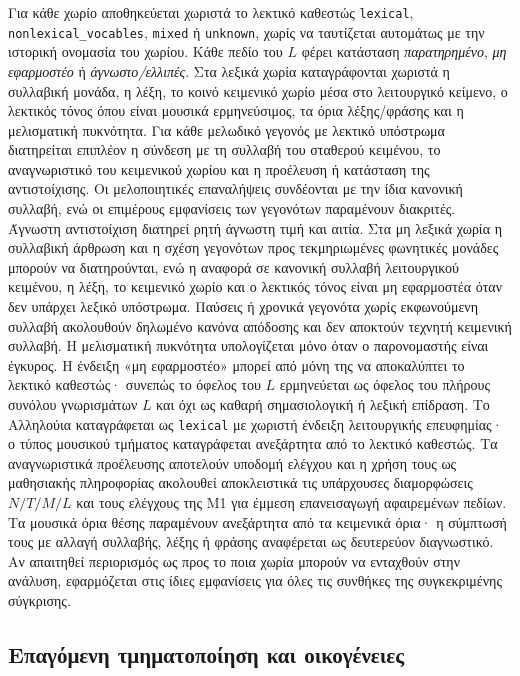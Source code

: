 \documentclass[11pt,a4paper]{article}
\begin{document}
Για κάθε χωρίο αποθηκεύεται χωριστά το λεκτικό καθεστώς \texttt{lexical}, \texttt{nonlexical\_vocables}, \texttt{mixed} ή \texttt{unknown}, χωρίς να ταυτίζεται αυτομάτως με την ιστορική ονομασία του χωρίου. Κάθε πεδίο του $L$ φέρει κατάσταση \emph{παρατηρημένο}, \emph{μη εφαρμοστέο} ή \emph{άγνωστο/ελλιπές}. Στα λεξικά χωρία καταγράφονται χωριστά η συλλαβική μονάδα, η λέξη, το κοινό κειμενικό χωρίο μέσα στο λειτουργικό κείμενο, ο λεκτικός τόνος όπου είναι μουσικά ερμηνεύσιμος, τα όρια λέξης/φράσης και η μελισματική πυκνότητα. Για κάθε μελωδικό γεγονός με λεκτικό υπόστρωμα διατηρείται επιπλέον η σύνδεση με τη συλλαβή του σταθερού κειμένου, το αναγνωριστικό του κειμενικού χωρίου και η προέλευση ή κατάσταση της αντιστοίχισης. Οι μελοποιητικές επαναλήψεις συνδέονται με την ίδια κανονική συλλαβή, ενώ οι επιμέρους εμφανίσεις των γεγονότων παραμένουν διακριτές. Άγνωστη αντιστοίχιση διατηρεί ρητή άγνωστη τιμή και αιτία. Στα μη λεξικά χωρία η συλλαβική άρθρωση και η σχέση γεγονότων προς τεκμηριωμένες φωνητικές μονάδες μπορούν να διατηρούνται, ενώ η αναφορά σε κανονική συλλαβή λειτουργικού κειμένου, η λέξη, το κειμενικό χωρίο και ο λεκτικός τόνος είναι μη εφαρμοστέα όταν δεν υπάρχει λεξικό υπόστρωμα. Παύσεις ή χρονικά γεγονότα χωρίς εκφωνούμενη συλλαβή ακολουθούν δηλωμένο κανόνα απόδοσης και δεν αποκτούν τεχνητή κειμενική συλλαβή. Η μελισματική πυκνότητα υπολογίζεται μόνο όταν ο παρονομαστής είναι έγκυρος. Η ένδειξη «μη εφαρμοστέο» μπορεί από μόνη της να αποκαλύπτει το λεκτικό καθεστώς· συνεπώς το όφελος του $L$ ερμηνεύεται ως όφελος του πλήρους συνόλου γνωρισμάτων $L$ και όχι ως καθαρή σημασιολογική ή λεξική επίδραση. Το Αλληλούια καταγράφεται ως \texttt{lexical} με χωριστή ένδειξη λειτουργικής επευφημίας· ο τύπος μουσικού τμήματος καταγράφεται ανεξάρτητα από το λεκτικό καθεστώς. Τα αναγνωριστικά προέλευσης αποτελούν υποδομή ελέγχου και η χρήση τους ως μαθησιακής πληροφορίας ακολουθεί αποκλειστικά τις υπάρχουσες διαμορφώσεις $N/T/M/L$ και τους ελέγχους της M1 για έμμεση επανεισαγωγή αφαιρεμένων πεδίων. Τα μουσικά όρια θέσης παραμένουν ανεξάρτητα από τα κειμενικά όρια· η σύμπτωσή τους με αλλαγή συλλαβής, λέξης ή φράσης αναφέρεται ως δευτερεύον διαγνωστικό. Αν απαιτηθεί περιορισμός ως προς το ποια χωρία μπορούν να ενταχθούν στην ανάλυση, εφαρμόζεται στις ίδιες εμφανίσεις για όλες τις συνθήκες της συγκεκριμένης σύγκρισης.



\subsection{Επαγόμενη τμηματοποίηση και οικογένειες}\label{app:repr-induced}
\end{document}

